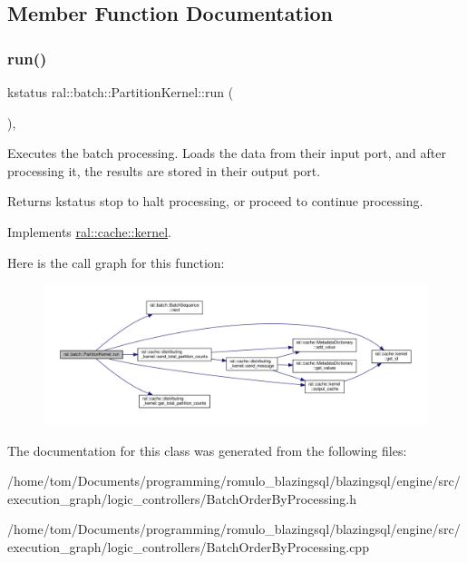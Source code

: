 \subsection{Member Function Documentation}
\mbox{\label{classral_1_1batch_1_1PartitionKernel_a5313617a63ab0fb23a0e4211399f439f}} 
\subsubsection{\texorpdfstring{run()}{run()}}
{\footnotesize\ttfamily kstatus ral\+::batch\+::\+Partition\+Kernel\+::run (\begin{DoxyParamCaption}{ }\end{DoxyParamCaption})\hspace{0.3cm}{\ttfamily [override]}, {\ttfamily [virtual]}}



Executes the batch processing. Loads the data from their input port, and after processing it, the results are stored in their output port. 

\begin{DoxyReturn}{Returns}
kstatus \textquotesingle{}stop\textquotesingle{} to halt processing, or \textquotesingle{}proceed\textquotesingle{} to continue processing. 
\end{DoxyReturn}


Implements \hyperlink{classral_1_1cache_1_1kernel_a735b081cccae9574924e74ea6d293ef7}{ral\+::cache\+::kernel}.

Here is the call graph for this function\+:\nopagebreak
\begin{figure}[H]
\begin{center}
\leavevmode
\includegraphics[width=350pt]{classral_1_1batch_1_1PartitionKernel_a5313617a63ab0fb23a0e4211399f439f_cgraph}
\end{center}
\end{figure}


The documentation for this class was generated from the following files\+:\begin{DoxyCompactItemize}
\item 
/home/tom/\+Documents/programming/romulo\+\_\+blazingsql/blazingsql/engine/src/execution\+\_\+graph/logic\+\_\+controllers/Batch\+Order\+By\+Processing.\+h\item 
/home/tom/\+Documents/programming/romulo\+\_\+blazingsql/blazingsql/engine/src/execution\+\_\+graph/logic\+\_\+controllers/Batch\+Order\+By\+Processing.\+cpp\end{DoxyCompactItemize}
